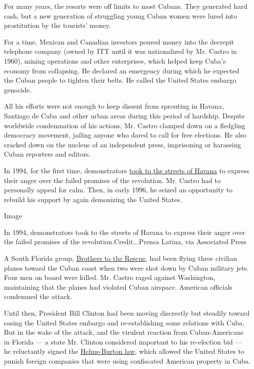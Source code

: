 For many years, the resorts were off limits to most Cubans. They
generated hard cash, but a new generation of struggling young Cuban
women were lured into prostitution by the tourists' money.

For a time, Mexican and Canadian investors poured money into the
decrepit telephone company (owned by ITT until it was nationalized by
Mr. Castro in 1960), mining operations and other enterprises, which
helped keep Cuba's economy from collapsing. He declared an emergency
during which he expected the Cuban people to tighten their belts. He
called the United States embargo genocide.

All his efforts were not enough to keep dissent from sprouting in
Havana, Santiago de Cuba and other urban areas during this period of
hardship. Despite worldwide condemnation of his actions, Mr. Castro
clamped down on a fledgling democracy movement, jailing anyone who dared
to call for free elections. He also cracked down on the nucleus of an
independent press, imprisoning or harassing Cuban reporters and editors.

In 1994, for the first time, demonstrators
\href{http://www.nytimes.com/1994/08/06/world/protesters-battle-police-in-havana-castro-warns-us.html}{took
to the streets of Havana} to express their anger over the failed
promises of the revolution. Mr. Castro had to personally appeal for
calm. Then, in early 1996, he seized an opportunity to rebuild his
support by again demonizing the United States.

Image

In 1994, demonstrators took to the streets of Havana to express their
anger over the failed promises of the revolution.Credit...Prensa Latina,
via Associated Press

A South Florida group,
\href{http://www.nytimes.com/1996/02/26/world/pilots-group-firm-foe-of-castro-ignored-risks.html}{Brothers
to the Rescue}, had been flying three civilian planes toward the Cuban
coast when two were shot down by Cuban military jets. Four men on board
were killed. Mr. Castro raged against Washington, maintaining that the
planes had violated Cuban airspace. American officials condemned the
attack.

Until then, President Bill Clinton had been moving discreetly but
steadily toward easing the United States embargo and re-establishing
some relations with Cuba. But in the wake of the attack, and the
virulent reaction from Cuban-Americans in Florida --- a state Mr.
Clinton considered important to his re-election bid --- he reluctantly
signed the
\href{http://www.nytimes.com/1995/09/22/world/bill-tighten-economic-embargo-cuba-passed-with-strong-support-house.html}{Helms-Burton
law}, which allowed the United States to punish foreign companies that
were using confiscated American property in Cuba.

